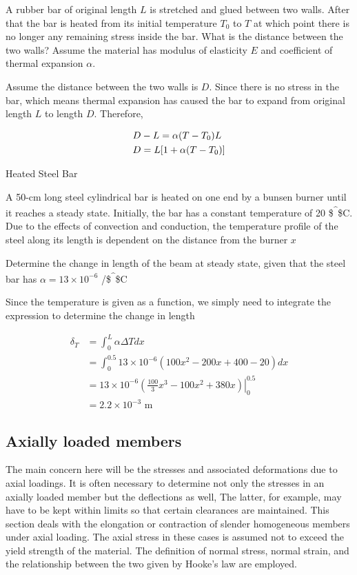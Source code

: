 \documentclass[a4paper,openany,nobib]{tufte-book}
\begin{document}
A rubber bar of original length \(L\) is stretched and glued between two
walls. After that the bar is heated from its initial temperature \(T_0\)
to \(T\) at which point there is no longer any remaining stress inside the
bar. What is the distance between the two walls? Assume the material has
modulus of elasticity \(E\) and coefficient of thermal expansion \(\alpha\).


Assume the distance between the two walls is \(D\). Since there is no
stress in the bar, which means thermal expansion has caused the bar to
expand from original length \(L\) to length \(D\). Therefore,

$$\begin{gathered}
  D - L = \alpha (T - T_0)L \hfill \\
  D = L[1 + \alpha (T - T_0)] \hfill \\ 
\end{gathered}$$

Heated Steel Bar

A 50-cm long steel cylindrical bar is heated on one end by a bunsen
burner until it reaches a steady state. Initially, the bar has a
constant temperature of 20 \$\textsuperscript{\^{}}\$C. Due to the effects of convection
and conduction, the temperature profile of the steel along its length is
dependent on the distance from the burner \(x\)


Determine the change in length of the beam at steady state, given that
the steel bar has \(\alpha = 13 \times 10^{-6}\) /\$\textsuperscript{\^{}}\$C

Since the temperature is given as a function, we simply need to
integrate the expression to determine the change in length

$$\begin{aligned}
    \delta_T &= \int_0^L \alpha \Delta T dx \\
             &= \int_0^{0.5} 13 \times 10^{-6} (100x^2 - 200x + 400 - 20) dx \\
             &= 13 \times 10^{-6} \left. \left( \frac{100}{3} x^3 - 100 x^2 + 380 x \right) \right|_0^{0.5} \\
             &= 2.2 \times 10^{-3} \text{ m}
  \end{aligned}$$

\subsection{Axially loaded members}
\label{axially-loaded-members}
The main concern here will be the stresses and associated deformations
due to axial loadings. It is often necessary to determine not only the
stresses in an axially loaded member but the deflections as well, The
latter, for example, may have to be kept within limits so that certain
clearances are maintained. This section deals with the elongation or
contraction of slender homogeneous members under axial loading. The
axial stress in these cases is assumed not to exceed the yield strength
of the material. The definition of normal stress, normal strain, and the
relationship between the two given by Hooke's law are employed.
\end{document}
